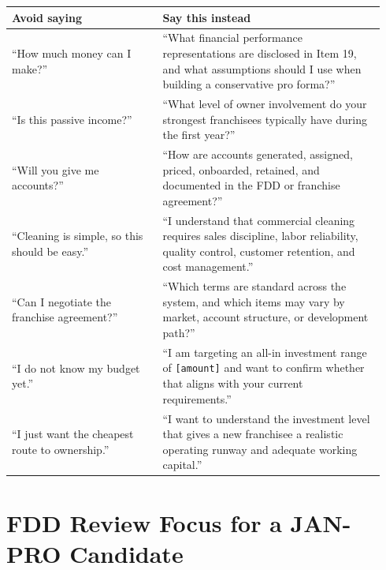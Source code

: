 \documentclass[11pt]{article}
\newcommand{\placeholder}[1]{\textcolor{accent}{\texttt{[#1]}}}
\newcommand{\janpro}{JAN-PRO}
\begin{document}
\begin{longtable}{>{\raggedright\arraybackslash}p{0.38\linewidth}>{\raggedright\arraybackslash}p{0.56\linewidth}}
\toprule
\textbf{Avoid saying} & \textbf{Say this instead} \\
\midrule
``How much money can I make?'' & ``What financial performance representations are disclosed in Item 19, and what assumptions should I use when building a conservative pro forma?'' \\
``Is this passive income?'' & ``What level of owner involvement do your strongest franchisees typically have during the first year?'' \\
``Will you give me accounts?'' & ``How are accounts generated, assigned, priced, onboarded, retained, and documented in the FDD or franchise agreement?'' \\
``Cleaning is simple, so this should be easy.'' & ``I understand that commercial cleaning requires sales discipline, labor reliability, quality control, customer retention, and cost management.'' \\
``Can I negotiate the franchise agreement?'' & ``Which terms are standard across the system, and which items may vary by market, account structure, or development path?'' \\
``I do not know my budget yet.'' & ``I am targeting an all-in investment range of \placeholder{amount} and want to confirm whether that aligns with your current requirements.'' \\
``I just want the cheapest route to ownership.'' & ``I want to understand the investment level that gives a new franchisee a realistic operating runway and adequate working capital.'' \\
\bottomrule
\end{longtable}

\section{FDD Review Focus for a \janpro{} Candidate}
\end{document}
